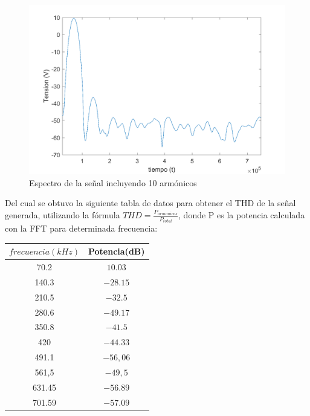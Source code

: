 \documentclass[../../tc_tp6_main.tex]{subfiles}
\begin{document}
\begin{figure}[H]	
	\centering
	\includegraphics[scale=0.5]{imagenes/fft_armonicos.png}
	\caption{Espectro de la señal incluyendo 10 armónicos}
	\label{fig:ej1_fft_armonicos}
\end{figure}

Del cual se obtuvo la siguiente tabla de datos para obtener el THD de la señal generada, utilizando la fórmula $THD = \frac{P_{armonicos}}{P_{total}}$, donde P es la potencia calculada con la FFT para determinada frecuencia: 

	\begin{table}[H] %
				\centering
 				\begin{tabular}{||c c||} 
 					\hline
					$frecuencia(kHz)$ & Potencia(dB)\\ [0.5ex] 
 					\hline\hline
					70.2 & $10.03$\\
					140.3 & $-28.15$\\
					210.5 & $-32.5$\\
					280.6 & $-49.17$\\
					350.8 & $-41.5$\\
					420 & $-44.33$\\
					491.1 & $-56,06$\\
					561,5 & $-49,5$\\
					631.45 & $-56.89$\\
					701.59 & $-57.09$\\[1ex] 
					\hline
				\end{tabular}
			\end{table}
\end{document}

